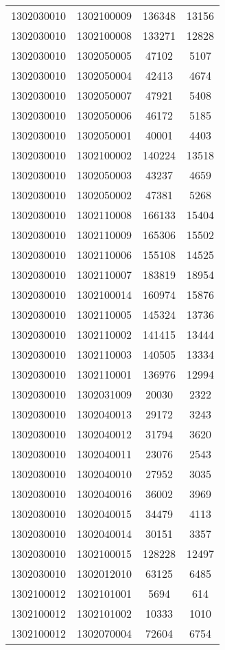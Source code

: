 \begin{longtable}[h]{llcc}
		1302030010 & 1302100009 & 136348 & 13156\\
		1302030010 & 1302100008 & 133271 & 12828\\
		1302030010 & 1302050005 & 47102 & 5107\\
		1302030010 & 1302050004 & 42413 & 4674\\
		1302030010 & 1302050007 & 47921 & 5408\\
		1302030010 & 1302050006 & 46172 & 5185\\
		1302030010 & 1302050001 & 40001 & 4403\\
		1302030010 & 1302100002 & 140224 & 13518\\
		1302030010 & 1302050003 & 43237 & 4659\\
		1302030010 & 1302050002 & 47381 & 5268\\
		1302030010 & 1302110008 & 166133 & 15404\\
		1302030010 & 1302110009 & 165306 & 15502\\
		1302030010 & 1302110006 & 155108 & 14525\\
		1302030010 & 1302110007 & 183819 & 18954\\
		1302030010 & 1302100014 & 160974 & 15876\\
		1302030010 & 1302110005 & 145324 & 13736\\
		1302030010 & 1302110002 & 141415 & 13444\\
		1302030010 & 1302110003 & 140505 & 13334\\
		1302030010 & 1302110001 & 136976 & 12994\\
		1302030010 & 1302031009 & 20030 & 2322\\
		1302030010 & 1302040013 & 29172 & 3243\\
		1302030010 & 1302040012 & 31794 & 3620\\
		1302030010 & 1302040011 & 23076 & 2543\\
		1302030010 & 1302040010 & 27952 & 3035\\
		1302030010 & 1302040016 & 36002 & 3969\\
		1302030010 & 1302040015 & 34479 & 4113\\
		1302030010 & 1302040014 & 30151 & 3357\\
		1302030010 & 1302100015 & 128228 & 12497\\
		1302030010 & 1302012010 & 63125 & 6485\\
		1302100012 & 1302101001 & 5694 & 614\\
		1302100012 & 1302101002 & 10333 & 1010\\
		1302100012 & 1302070004 & 72604 & 6754\\

\end{longtable}
